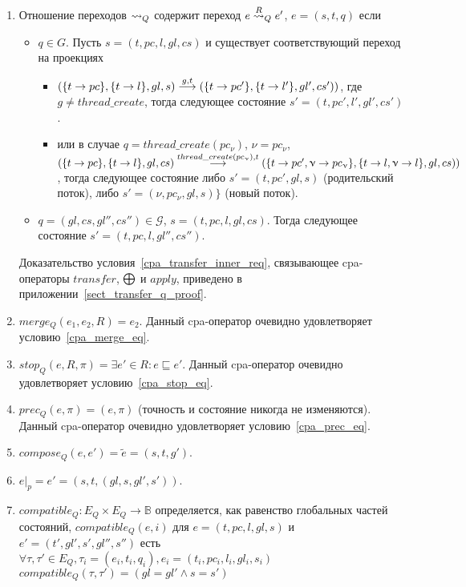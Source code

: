 \begin{enumerate}
\item
Отношение переходов $\leadsto_Q$ содержит переход $e \stackrel{R}{\leadsto}_Q e'$, $e=(s, t, q)$ если
\begin{itemize}
\item $q \in G$. Пусть $s=(t, pc, l, gl, cs)$ и существует соответствующий переход на проекциях
\begin{itemize}
\item $(\{t\to pc\}, \{t\to l\}, gl, s) \stackrel{g,t}{\longrightarrow} (\{t\to pc'\}, \{t\to l'\}, gl', cs'))$, где $g \ne thread\_create$, тогда 
следующее состояние $s' = (t,pc',l', gl',cs')$.
\item или в случае $q=thread\_create(pc_\nu)$, $\nu=pc_\nu$, \\
$(\{t\to pc\}, \{t\to l\}, gl, cs) \stackrel{thread\_create(pc_\upnu), t}{\longrightarrow} (\{t\to pc', \upnu \to pc_\upnu\}, \{t\to l,\upnu \to l\}, gl, cs))$, тогда 
следующее состояние либо $s' = (t,pc',gl,s)$ (родительский поток), либо $s' = (\nu,pc_\nu,gl,s)\}$ (новый поток).
\end{itemize}
\item $q=(gl, cs, gl'',cs'') \in \mathcal{G}$, $s=(t, pc, l, gl, cs)$. Тогда следующее состояние $s'=(t, pc, l, gl'', cs'')$.
\end{itemize}

Доказательство условия~\ref{cpa_transfer_inner_req}, связывающее cpa-операторы $transfer$, $\mathrel{\bigoplus}$ и $apply$, приведено в приложении~\ref{sect_transfer_q_proof}.

\item
$merge_Q(e_1,e_2,R) = e_2$.
Данный cpa-оператор очевидно удовлетворяет условию~\ref{cpa_merge_eq}.

\item
$stop_Q(e,R,\pi)=\exists e' \in R: e \sqsubseteq e'$.
Данный cpa-оператор очевидно удовлетворяет условию~\ref{cpa_stop_eq}.

\item
$prec_Q(e,\pi)=(e,\pi)$ (точность и состояние никогда не изменяются).
Данный cpa-оператор очевидно удовлетворяет условию~\ref{cpa_prec_eq}.

\item 
$compose_Q(e,e')=\tilde{e} = (s, t, g')$.

\item 
$e|_p = e' = (s, t, (gl, s, gl', s'))$.

\item
$compatible_Q: E_Q \times E_Q \to \mathbb{B}$ определяется, как равенство глобальных частей состояний, $compatible_Q(e,i)$ для $e=(t,pc, l, gl,s)$ и $e'=(t',gl',s',gl'',s'')$ есть    
$\forall \tau, \tau' \in E_Q, \tau_i = (e_i, t_i, q_i), e_i=(t_i,pc_i, l_i, gl_i,s_i)$ \\
$compatible_Q(\tau, \tau') = (gl=gl' \land s=s')$

\end{enumerate}

